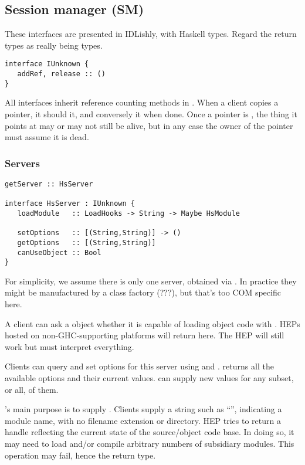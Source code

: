 \subsection{Session manager (SM)}
These interfaces are presented in IDLishly, with
Haskell types.  Regard the return types as really being \verb@IO@
types.
\begin{verbatim}
interface IUnknown {
   addRef, release :: ()
}
\end{verbatim}
All interfaces inherit reference counting methods in \verb@IUnknown@.
When a client copies a pointer, it should \verb@addRef@ it, and
conversely \verb@release@ it when done.
Once a pointer is \verb@release@d, the thing it points at may or
may not still be alive, but in any case the owner of the
pointer must assume it is dead.  

\subsubsection{Servers}
\begin{verbatim}
getServer :: HsServer

interface HsServer : IUnknown {
   loadModule   :: LoadHooks -> String -> Maybe HsModule

   setOptions   :: [(String,String)] -> ()
   getOptions   :: [(String,String)]
   canUseObject :: Bool
}
\end{verbatim}
For simplicity, we assume there is only one server, obtained
via \verb@getServer@.  In practice they might be manufactured 
by a class factory (???), but that's too COM specific here.

A client can ask a \verb@HsServer@ object whether it is 
capable of loading object code with \verb@canUseObject@.
HEPs hosted on non-GHC-supporting platforms will return
\verb@False@ here.  The HEP will still work but must
interpret everything.

Clients can query and set options for this server using
\verb@getOptions@ and \verb@setOptions@.  \verb@getOptions@
returns all the available options and their current values.
\verb@setOptions@ can supply new values for any subset, or all, of
them.

\verb@HsServer@'s main purpose is to supply \verb@loadModule@.
Clients supply a string such as ``\verb@List@'', indicating a
module name, with no filename extension or directory.  
HEP tries to return a \verb@HsModule@ handle reflecting
the current state of the source/object code base.  In doing so,
it may need to load and/or compile arbitrary numbers of 
subsidiary modules.  This operation may fail, hence the \verb@Maybe@
return type.

